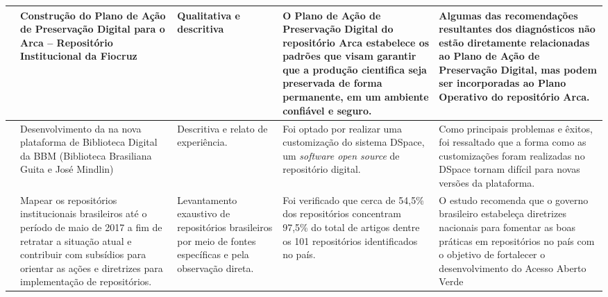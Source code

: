 \begin{landscape}
\begin{table}[H]
{\begin{tabular}{|p{5cm}|p{10cm}|p{8cm}|p{10cm}|p{12cm}|}
                \cite{QueirozArca:2020}              & Construção do Plano de Ação de Preservação Digital para o Arca – Repositório Institucional da Fiocruz                                                                                                                 & Qualitativa e descritiva                                                                                    & O Plano de Ação de Preservação Digital do repositório Arca estabelece os padrões que visam garantir que a produção cientifica seja preservada de forma permanente, em um ambiente confiável e seguro. & Algumas das recomendações resultantes dos diagnósticos não estão diretamente relacionadas ao Plano de Ação de Preservação Digital, mas podem ser incorporadas ao Plano Operativo do repositório Arca.                                      \\ \hline
                \cite{GarciaRodrigoMoreira2019DdnB}  & Desenvolvimento da na nova plataforma de Biblioteca Digital da BBM (Biblioteca Brasiliana Guita e José Mindlin)                                                                                                       & Descritiva e relato de experiência.                                                                         & Foi optado por realizar uma customização do sistema DSpace, um \emph{software open source} de repositório digital.                                                                                    & Como principais problemas e êxitos, foi ressaltado  que a forma como as customizações foram realizadas no DSpace tornam difícil para novas versões da plataforma.                                                                          \\ \hline
                \cite{Weitzel:2019}                  & Mapear os repositórios institucionais brasileiros até o período de maio de 2017 a fim de retratar a situação atual e contribuir com subsídios para orientar as ações e diretrizes para implementação de repositórios. & Levantamento exaustivo de repositórios brasileiros por meio de fontes específicas e pela observação direta. & Foi verificado que cerca de 54,5\% dos repositórios concentram 97,5\% do total de artigos dentre os 101 repositórios identificados no país.                                                           & O estudo recomenda que o governo brasileiro estabeleça diretrizes nacionais para fomentar as boas práticas em repositórios no país com o objetivo de fortalecer o desenvolvimento do Acesso Aberto Verde                                   \\ \hline

\end{tabular}}
\end{table}
\end{landscape}

